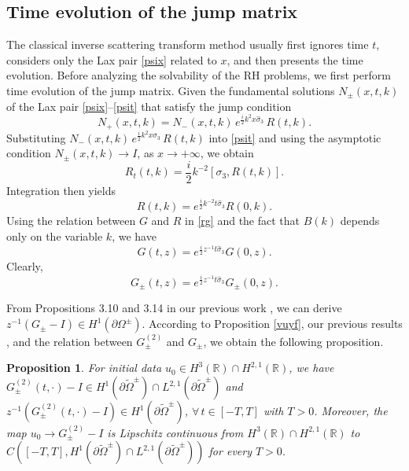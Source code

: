 \documentclass[preprint,compress,12pt]{elsarticle}
\newtheorem{proposition}[theorem]{Proposition}
\numberwithin{equation}{section}
\begin{document}
\subsection{Time evolution of the jump matrix}\label{sub34}
The classical inverse scattering transform method usually first ignores time $t$, considers only the Lax pair \eqref{psix} related to $x$, and then presents the time evolution. Before analyzing the solvability of the RH problems, we first perform time evolution of the jump matrix. Given the fundamental solutions $N_{\pm}(x,t,k)$ of the Lax pair \eqref{psix}--\eqref{psit} that satisfy the jump condition
\begin{equation*}
N_{+}(x,t,k)=N_{-}(x,t,k)\,e^{\frac{i}{2}k^{2}x\widehat{\sigma}_{3}}\,R(t,k).
\end{equation*}
Substituting $N_{-}(x,t,k)\,e^{\frac{i}{2}k^{2}x\sigma_{3}}\,R(t,k)$ into \eqref{psit} and using the asymptotic condition $N_{\pm}(x,t,k)\rightarrow I$, as $x\rightarrow +\infty$, we obtain
\begin{equation*}
R_{t}(t,k)=\frac{i}{2}k^{-2}[\sigma_{3},R(t,k)].
\end{equation*}
Integration then yields
\begin{equation*}
R(t,k)=e^{\frac{i}{2}k^{-2}t\widehat{\sigma}_{3}}R(0,k).
\end{equation*}
Using the relation between $G$ and $R$ in \eqref{rg} and the fact that  $B(k)$ depends only on the variable $k$, we have
\begin{equation}
G(t,z)=e^{\frac{i}{2}z^{-1}t\widehat{\sigma}_{3}}G(0,z).
\end{equation}
Clearly,
\begin{equation}
G_{\pm}(t,z)=e^{\frac{i}{2}z^{-1}t\widehat{\sigma}_{3}}G_{\pm}(0,z).
\end{equation}

From Propositions 3.10 and 3.14 in our previous work \cite{Chengglo}, we can derive $z^{-1}(G_{\pm}-I )\in H^{1}(\partial\Omega^{\pm})$. According to Proposition \ref{vuyf}, our previous results \cite{Chengglo}, and the relation between $G_{\pm}^{(2)}$ and $G_{\pm}$, we obtain the following proposition.
\begin{proposition}\label{timep}
For initial data $u_{0}\in  H^{3}(\mathbb{R})\cap H^{2,1}(\mathbb{R})$, we have $G^{(2)}_{\pm}(t,\cdot)-I \in H^{1}(\partial\widetilde{\Omega}^{\pm})\cap L^{2,1}(\partial\widetilde{\Omega}^{\pm})$ and $z^{-1}(G^{(2)}_{\pm}(t,\cdot)-I )\in H^{1}(\partial\widetilde{\Omega}^{\pm})$,  $\forall\, t\in [-T,T]$ with $T>0$. Moreover, the map $u_{0}\rightarrow G^{(2)}_{\pm}-I$ is Lipschitz continuous from  $H^{3}(\mathbb{R})\cap H^{2,1}(\mathbb{R})$ to $C([-T,T], H^{1}(\partial\widetilde{\Omega}^{\pm})\cap L^{2,1}(\partial\widetilde{\Omega}^{\pm}))$ for every $T>0$.
\end{proposition}
\end{document}
